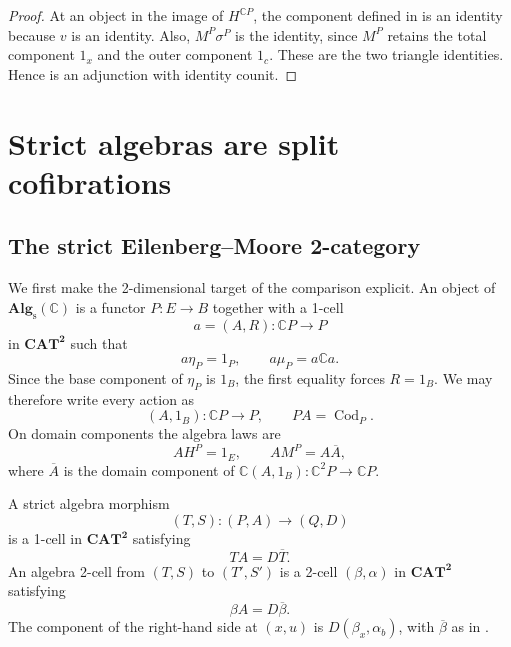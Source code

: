 \documentclass[11pt]{article}
\theoremstyle{plain}
\theoremstyle{definition}
\theoremstyle{remark}
\newcommand{\CAT}{\mathbf{CAT}}
\newcommand{\Alg}{\mathbf{Alg}_{\mathrm{s}}}
\newcommand{\Cod}{\operatorname{Cod}}
\newcommand{\C}{\mathbb{C}}
\numberwithin{equation}{section}
\begin{document}
\begin{proof}
At an object in the image of $H^{\C P}$, the component defined in
 is an identity because $v$ is an identity.  Also,
$M^{P}\sigma^{P}$ is the identity, since $M^{P}$ retains the total
component $1_x$ and the outer component $1_c$.  These are the two
triangle identities.  Hence  is an adjunction
with identity counit.
\end{proof}

\section{Strict algebras are split cofibrations}
\label{sec:monadicity}

\subsection{The strict Eilenberg--Moore 2-category}

We first make the 2-dimensional target of the comparison explicit.
An object of $\Alg(\C)$ is a functor $P\colon E\to B$ together with a
1-cell
\begin{equation*}
a=(A,R)\colon\C P\longrightarrow P
\end{equation*}
in $\CAT^{\mathbf 2}$ such that
\begin{equation}
a\eta_P=1_P,
  \qquad
  a\mu_P=a\C a.
  \label{eq:abstract-algebra-laws}
\end{equation}
Since the base component of $\eta_P$ is $1_B$, the first equality
forces $R=1_B$.  We may therefore write every action as
\begin{equation*}
(A,1_B)\colon\C P\longrightarrow P,
  \qquad
  PA=\Cod_P.
\end{equation*}
On domain components the algebra laws are
\begin{equation}
AH^{P}=1_E,
  \qquad
  AM^{P}=A\overline A,
  \label{eq:algebra-laws}
\end{equation}
where $\overline A$ is the domain component of
$\C(A,1_B)\colon\C^2P\to\C P$.

A strict algebra morphism
\begin{equation*}
(T,S)\colon(P,A)\longrightarrow(Q,D)
\end{equation*}
is a 1-cell in $\CAT^{\mathbf 2}$ satisfying
\begin{equation}
TA=D\overline T.
  \label{eq:strict-algebra-morphism}
\end{equation}
An algebra 2-cell from $(T,S)$ to $(T',S')$ is a 2-cell
$(\beta,\alpha)$ in $\CAT^{\mathbf 2}$ satisfying
\begin{equation}
\beta A=D\overline\beta.
  \label{eq:algebra-2cell}
\end{equation}
The component of the right-hand side at $(x,u)$ is
$D(\beta_x,\alpha_b)$, with $\overline\beta$ as in
.
\end{document}
